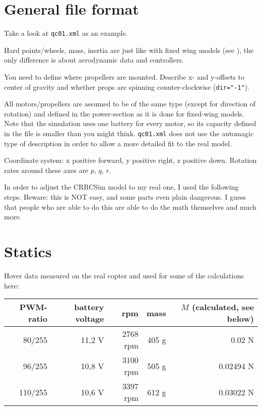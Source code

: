 \documentclass[a4paper, 11pt, pdftex]{article}
\author{\jwwAuthor}
\title{\jwwTitle}
\date{06.12.2009}
\begin{document}
  \maketitle
  \tableofcontents
  \clearpage

  \setlength{\parindent}{0pt}
  \setlength{\parskip}{5pt plus 2pt minus 1pt}
  
  \section{General file format}

    Take a look at {\tt qc01.xml} as an example.

    Hard points/wheels, mass, inertia are just like with fixed wing models
    (see \cite{l:C_FILE}),
    the only difference is about aerodynamic data and controllers.  

    You need to define where propellers are mounted. Describe x- and
    y-offsets to center of gravity and whether props are spinning
    counter-clockwise ({\tt dir="-1"}).

    All motors/propellers are assumed to be of the same type (except for
    direction of rotation) and defined in the power-section as it is done
    for fixed-wing models. Note that the simulation uses one battery for
    every motor, so its capacity defined in the file is smaller than you
    might think. {\tt qc01.xml} does not use the automagic type of description in
    order to allow a more detailed fit to the real model.

    Coordinate system: x positive forward, y positive right, z positive
    down. Rotation rates around these axes are $p$, $q$, $r$.

    In order to adjust the CRRCSim model to my real one, I used the
    following steps. Beware: this is NOT easy, and some parts even plain
    dangerous. I guess that people who are able to do this are able to
    do the math themselves and much more.

  \section{Statics}
  
    Hover data measured on the real copter and used for some of the calculations here:
    
    \begin{tabular}{r|r|r|r|r}
      PWM-ratio &  battery voltage &      rpm & mass  &  $M$ (calculated, see below)\\
      \hline
      80/255    &  11,2 V          & 2768 rpm & 405 g &  0.02 N\\
      96/255    &  10,8 V          & 3100 rpm & 505 g &  0.02494 N\\
      110/255   &  10,6 V          & 3397 rpm & 612 g &  0.03022 N\\
    \end{tabular}
\end{document}
